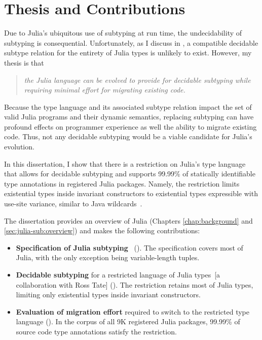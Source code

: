 \section{Thesis and Contributions}

Due to Julia's ubiquitous use of subtyping at run time,
the undecidability of subtyping is consequential.
Unfortunately, as I discuss in ,
a compatible decidable subtype relation for the entirety of Julia types
is unlikely to exist.
However, my thesis is that
\begin{quotation}\emph{
  the Julia language can be evolved to provide for decidable subtyping while
  requiring minimal effort for migrating existing code.
}\end{quotation}

Because the type language and its associated subtype relation 
impact the set of valid Julia programs and their dynamic semantics,
replacing subtyping can have profound effects on programmer experience 
as well the ability to migrate existing code.
Thus, not any decidable subtyping would be a viable candidate for
Julia's evolution.

In this dissertation, I show that there is
a restriction on Julia's type language that allows for decidable subtyping
and supports 99.99\% of statically identifiable type annotations
in registered Julia packages.
Namely, the restriction limits existential types inside invariant constructors
to existential types expressible with use-site variance,
similar to Java wildcards~\cite{bib:torgersen:wildcards:2004}.

The dissertation provides an overview of Julia
(Chapters \ref{chap:background} and \ref{sec:julia-sub:overview})
and makes the following contributions:
\begin{itemize}
  \item \textbf{Specification of Julia
    subtyping}~\citep*{bib:zappa-nardelli:julia-sub:oopsla:2018}
    ().
    The specification covers most of Julia, with the only exception being
    variable-length tuples.
  \item \textbf{Decidable subtyping} for a restricted language of Julia 
    types~[a collaboration with Ross Tate] ().
    The restriction retains most of Julia types, limiting only existential types
    inside invariant constructors.
  \item \textbf{Evaluation of migration effort} required to switch to 
    the restricted type language (). 
    In the corpus of all 9K registered Julia packages, 99.99\% of source code 
    type annotations satisfy the restriction.
\end{itemize}
